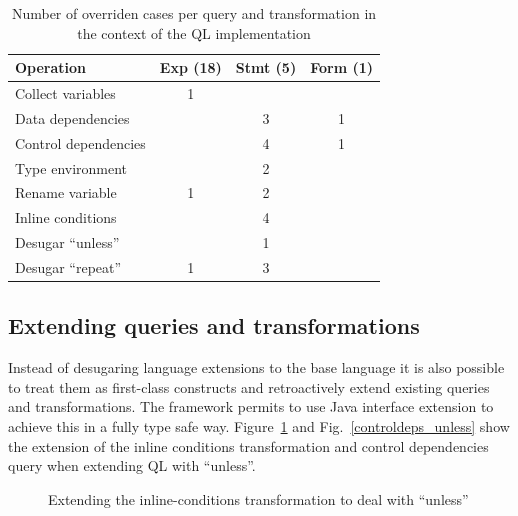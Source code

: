 \begin{table}[t]
  \centering
  \begin{tabular}{l|c|c|c}
    Operation            & Exp (18) & Stmt (5) & Form (1) \\\hline
    Collect variables    & 1              &                &               \\
    Data dependencies    &                & 3               & 1             \\
    Control dependencies &                & 4              & 1             \\
    Type environment     &                & 2              &               \\\hline
    Rename variable      & 1              & 2              &               \\
    Inline conditions    &                & 4              &               \\
    Desugar ``unless''   &                & 1              &               \\
    Desugar ``repeat''   & 1              & 3              &               \\
  \end{tabular}
  \caption{Number of overriden cases per query and transformation in
    the context of the QL implementation\label{TBL:qlresults}}
\end{table}


\subsection{Extending queries and transformations}

Instead of desugaring language extensions to the base language it is also possible to treat them as first-class constructs and retroactively extend existing queries and transformations.
The framework permits to use  Java interface extension to achieve this in a fully type safe way.
Figure~\ref{inline_conds_unless} and Fig.~\ref{controldeps_unless} show the extension of the inline conditions transformation and control dependencies query when extending QL with ``unless''.

\begin{figure}[tb]
\vspace{-.1in}
\caption{Extending the inline-conditions transformation to deal with ``unless''}
\label{inline_conds_unless}
\end{figure}

